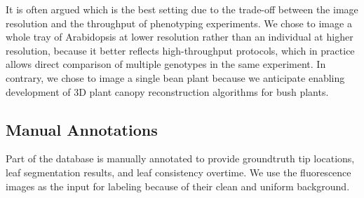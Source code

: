 
It is often argued which is the best setting due to the trade-off between the image resolution and the throughput of phenotyping experiments.
We chose to image a whole tray of Arabidopsis at lower resolution rather than an individual at higher resolution, because it better reflects high-throughput protocols, which in practice allows direct comparison of multiple genotypes in the same experiment.
In contrary, we chose to image a single bean plant because we anticipate enabling development of $3$D plant canopy reconstruction algorithms for bush plants.


\subsection{Manual Annotations}
\label{sec:annotation}
Part of the database is manually annotated to provide groundtruth tip locations, leaf segmentation results, and leaf consistency overtime.
We use the fluorescence images as the input for labeling because of their clean and uniform background.

